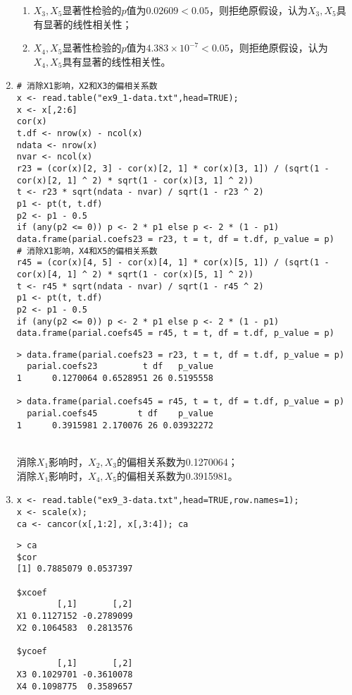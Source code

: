 \begin{enumerate}
\begin{enumerate}[label=(\arabic*)]
        \item $X_3,X_5$显著性检验的$p$值为$0.02609 < 0.05$，则拒绝原假设，认为$X_3,X_5$具有显著的线性相关性；
        \item $X_4,X_5$显著性检验的$p$值为$4.383\times 10^{-7} < 0.05$，则拒绝原假设，认为$X_4,X_5$具有显著的线性相关性。
    \end{enumerate}
    \item
    \code
\begin{lstlisting}
# 消除X1影响，X2和X3的偏相关系数
x <- read.table("ex9_1-data.txt",head=TRUE);
x <- x[,2:6]
cor(x)
t.df <- nrow(x) - ncol(x)
ndata <- nrow(x)
nvar <- ncol(x)
r23 = (cor(x)[2, 3] - cor(x)[2, 1] * cor(x)[3, 1]) / (sqrt(1 - cor(x)[2, 1] ^ 2) * sqrt(1 - cor(x)[3, 1] ^ 2))
t <- r23 * sqrt(ndata - nvar) / sqrt(1 - r23 ^ 2)
p1 <- pt(t, t.df)
p2 <- p1 - 0.5
if (any(p2 <= 0)) p <- 2 * p1 else p <- 2 * (1 - p1)
data.frame(parial.coefs23 = r23, t = t, df = t.df, p_value = p)
# 消除X1影响，X4和X5的偏相关系数
r45 = (cor(x)[4, 5] - cor(x)[4, 1] * cor(x)[5, 1]) / (sqrt(1 - cor(x)[4, 1] ^ 2) * sqrt(1 - cor(x)[5, 1] ^ 2))
t <- r45 * sqrt(ndata - nvar) / sqrt(1 - r45 ^ 2)
p1 <- pt(t, t.df)
p2 <- p1 - 0.5
if (any(p2 <= 0)) p <- 2 * p1 else p <- 2 * (1 - p1)
data.frame(parial.coefs45 = r45, t = t, df = t.df, p_value = p)
\end{lstlisting}
    \out
\begin{lstlisting}
> data.frame(parial.coefs23 = r23, t = t, df = t.df, p_value = p)
  parial.coefs23         t df   p_value
1      0.1270064 0.6528951 26 0.5195558

> data.frame(parial.coefs45 = r45, t = t, df = t.df, p_value = p)
  parial.coefs45        t df    p_value
1      0.3915981 2.170076 26 0.03932272
\end{lstlisting}
    \summary\\
    消除$X_1$影响时，$X_2,X_3$的偏相关系数为0.1270064；\\
    消除$X_1$影响时，$X_4,X_5$的偏相关系数为0.3915981。
    \item
    \code
\begin{lstlisting}
x <- read.table("ex9_3-data.txt",head=TRUE,row.names=1);
x <- scale(x);
ca <- cancor(x[,1:2], x[,3:4]); ca
\end{lstlisting}
    \out
\begin{lstlisting}
> ca
$cor
[1] 0.7885079 0.0537397

$xcoef
        [,1]       [,2]
X1 0.1127152 -0.2789099
X2 0.1064583  0.2813576

$ycoef
        [,1]       [,2]
X3 0.1029701 -0.3610078
X4 0.1098775  0.3589657


\end{lstlisting}
\end{enumerate}
